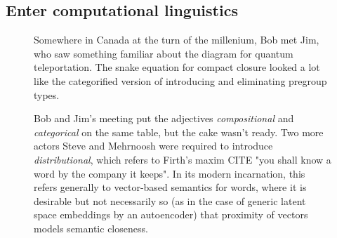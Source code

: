 \subsection{Enter computational linguistics}

\begin{figure}[h!]
\centering
{}
\caption{Somewhere in Canada at the turn of the millenium, Bob met Jim, who saw something familiar about the diagram for quantum teleportation. The snake equation for compact closure looked a lot like the categorified version of introducing and eliminating pregroup types.
}
\end{figure}

\begin{figure}[h!]
\centering
{}
\caption{Bob and Jim's meeting put the adjectives \emph{compositional} and \emph{categorical} on the same table, but the cake wasn't ready. Two more actors Steve and Mehrnoosh were required to introduce \emph{distributional}, which refers to Firth's maxim \bR CITE \e "you shall know a word by the company it keeps". In its modern incarnation, this refers generally to vector-based semantics for words, where it is desirable but not necessarily so (as in the case of generic latent space embeddings by an autoencoder) that proximity of vectors models semantic closeness.}
\end{figure}

